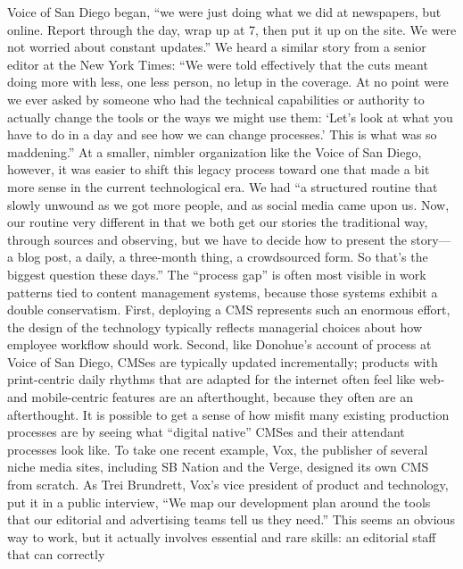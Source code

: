 Voice of San Diego began, ``we were just doing what we did at newspapers, but
online. Report through the day, wrap up at 7, then put it up on the site. We were
not worried about constant updates.''
We heard a similar story from a senior editor at the New York Times: ``We were
told effectively that the cuts meant doing more with less, one less person, no
letup in the coverage. At no point were we ever asked by someone who had the
technical capabilities or authority to actually change the tools or the ways we
might use them: ‘Let’s look at what you have to do in a day and see how we can
change processes.’ This is what was so maddening.''
At a smaller, nimbler organization like the Voice of San Diego, however, it was
easier to shift this legacy process toward one that made a bit more sense in the
current technological era. We had ``a structured routine that slowly unwound
as we got more people, and as social media came upon us. Now, our routine
very different in that we both get our stories the traditional way, through
sources and observing, but we have to decide how to present the story—a blog
post, a daily, a three-month thing, a crowdsourced form. So that’s the biggest
question these days.''
The ``process gap'' is often most visible in work patterns tied to content management
systems, because those systems exhibit a double conservatism. First,
deploying a CMS represents such an enormous effort, the design of the technology
typically reflects managerial choices about how employee workflow should
work. Second, like Donohue’s account of process at Voice of San Diego, CMSes
are typically updated incrementally; products with print-centric daily rhythms
that are adapted for the internet often feel like web- and mobile-centric features
are an afterthought, because they often are an afterthought.
It is possible to get a sense of how misfit many existing production processes
are by seeing what ``digital native'' CMSes and their attendant processes look
like. To take one recent example, Vox, the publisher of several niche media sites,
including SB Nation and the Verge, designed its own CMS from scratch. As
Trei Brundrett, Vox’s vice president of product and technology, put it in a public
interview, ``We map our development plan around the tools that our editorial
and advertising teams tell us they need.'' This seems an obvious way to work,
but it actually involves essential and rare skills: an editorial staff that can correctly

